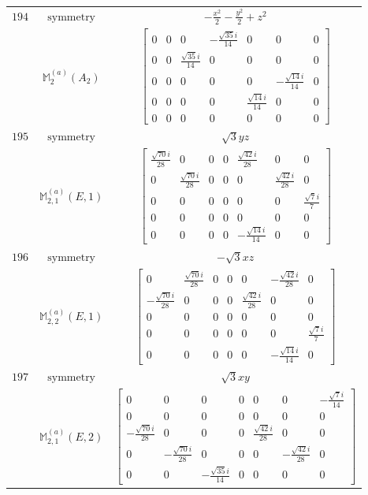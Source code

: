 \documentclass[fleqn,8pt,landscape]{jsarticle}
\begin{document}
\begin{longtable}{ccc}
$ 194 $ & $ \text{symmetry} $ & $ - \frac{x^{2}}{2} - \frac{y^{2}}{2} + z^{2} $ \\
$  $ & $ \mathbb{M}_{2}^{(a)}(A_{2}) $ & $ \begin{bmatrix} 0 & 0 & 0 & - \frac{\sqrt{35} i}{14} & 0 & 0 & 0 \\ 0 & 0 & \frac{\sqrt{35} i}{14} & 0 & 0 & 0 & 0 \\ 0 & 0 & 0 & 0 & 0 & - \frac{\sqrt{14} i}{14} & 0 \\ 0 & 0 & 0 & 0 & \frac{\sqrt{14} i}{14} & 0 & 0 \\ 0 & 0 & 0 & 0 & 0 & 0 & 0 \end{bmatrix} $ \\ \hline
$ 195 $ & $ \text{symmetry} $ & $ \sqrt{3} y z $ \\
$  $ & $ \mathbb{M}_{2,1}^{(a)}(E,1) $ & $ \begin{bmatrix} \frac{\sqrt{70} i}{28} & 0 & 0 & 0 & \frac{\sqrt{42} i}{28} & 0 & 0 \\ 0 & \frac{\sqrt{70} i}{28} & 0 & 0 & 0 & \frac{\sqrt{42} i}{28} & 0 \\ 0 & 0 & 0 & 0 & 0 & 0 & \frac{\sqrt{7} i}{7} \\ 0 & 0 & 0 & 0 & 0 & 0 & 0 \\ 0 & 0 & 0 & 0 & - \frac{\sqrt{14} i}{14} & 0 & 0 \end{bmatrix} $ \\ \hline
$ 196 $ & $ \text{symmetry} $ & $ - \sqrt{3} x z $ \\
$  $ & $ \mathbb{M}_{2,2}^{(a)}(E,1) $ & $ \begin{bmatrix} 0 & \frac{\sqrt{70} i}{28} & 0 & 0 & 0 & - \frac{\sqrt{42} i}{28} & 0 \\ - \frac{\sqrt{70} i}{28} & 0 & 0 & 0 & \frac{\sqrt{42} i}{28} & 0 & 0 \\ 0 & 0 & 0 & 0 & 0 & 0 & 0 \\ 0 & 0 & 0 & 0 & 0 & 0 & \frac{\sqrt{7} i}{7} \\ 0 & 0 & 0 & 0 & 0 & - \frac{\sqrt{14} i}{14} & 0 \end{bmatrix} $ \\ \hline
$ 197 $ & $ \text{symmetry} $ & $ \sqrt{3} x y $ \\
$  $ & $ \mathbb{M}_{2,1}^{(a)}(E,2) $ & $ \begin{bmatrix} 0 & 0 & 0 & 0 & 0 & 0 & - \frac{\sqrt{7} i}{14} \\ 0 & 0 & 0 & 0 & 0 & 0 & 0 \\ - \frac{\sqrt{70} i}{28} & 0 & 0 & 0 & \frac{\sqrt{42} i}{28} & 0 & 0 \\ 0 & - \frac{\sqrt{70} i}{28} & 0 & 0 & 0 & - \frac{\sqrt{42} i}{28} & 0 \\ 0 & 0 & - \frac{\sqrt{35} i}{14} & 0 & 0 & 0 & 0 \end{bmatrix} $ \\ \hline

\end{longtable}
\end{document}
